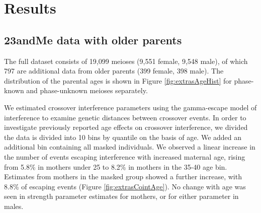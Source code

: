 \section{Results}
\subsection{23andMe data with older parents}

The full dataset consists of 19,099 meioses (9,551 female, 9,548 male), of which 797 are additional data from older parents (399 female, 398 male).
The distribution of the parental ages is shown in Figure \ref{fig:extrasAgeHist} for phase-known and phase-unknown meioses separately.

We estimated crossover interference parameters using the gamma-escape model of interference\cite{Housworth2003} to examine genetic distances between crossover events.
In order to investigate previously reported age effects on crossover interference, we divided the data is divided into 10 bins by quantile on the basis of age.
We added an additional bin containing all masked individuals.
We observed a linear increase in the number of events escaping interference with increased maternal age, rising from 5.8\% in mothers under 25 to 8.2\% in mothers in the 35-40 age bin.
Estimates from mothers in the masked group showed a further increase, with 8.8\% of escaping events (Figure \ref{fig:extrasCointAge}).
No change with age was seen in strength parameter estimates for mothers, or for either parameter in males.



